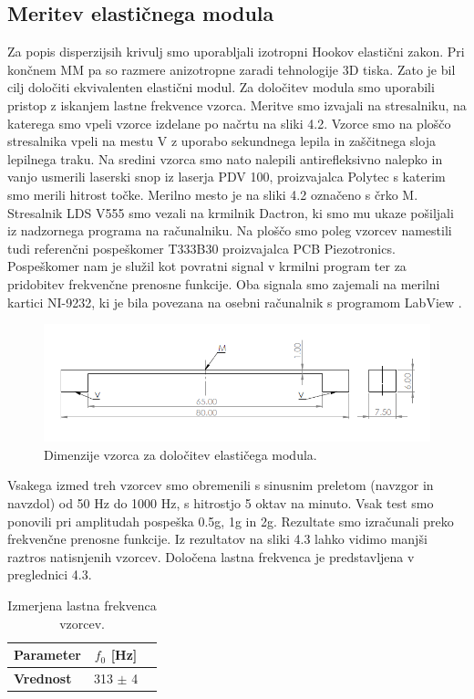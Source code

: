 \documentclass[12pt]{report}
\begin{document}
\subsection{Meritev elastičnega modula}
Za popis disperzijsih krivulj smo uporabljali izotropni Hookov elastični zakon. Pri končnem \ac{MM} pa so razmere anizotropne zaradi tehnologije 3D tiska. Zato je bil cilj določiti ekvivalenten 
elastični modul. Za določitev modula smo uporabili pristop z iskanjem lastne frekvence vzorca. Meritve smo izvajali na stresalniku, na katerega smo vpeli vzorce izdelane po načrtu na sliki 4.2. Vzorce smo na 
ploščo stresalnika vpeli na mestu V z uporabo sekundnega lepila in zaščitnega sloja lepilnega traku. Na sredini vzorca smo nato nalepili antirefleksivno nalepko in vanjo usmerili laserski snop iz laserja PDV 100, proizvajalca
Polytec s katerim smo merili hitrost točke. Merilno mesto je na sliki 4.2 označeno s črko M. Stresalnik LDS V555 smo vezali na krmilnik Dactron, ki smo mu ukaze pošiljali iz nadzornega programa na računalniku. Na ploščo smo poleg vzorcev namestili tudi 
referenčni pospeškomer T333B30 proizvajalca PCB Piezotronics. Pospeškomer nam je služil kot povratni signal v krmilni program ter za pridobitev frekvenčne prenosne funkcije. Oba signala smo zajemali na merilni kartici NI-9232, ki je bila povezana
na osebni računalnik s programom LabView \cite{labview}.
\\
\begin{figure}[H]
  \centering
  \includegraphics[scale=0.9]{Images/tester.png}
  \caption{Dimenzije vzorca za določitev elastičega modula.}
\end{figure}
\noindent Vsakega izmed treh vzorcev smo obremenili s sinusnim preletom (navzgor in navzdol) od 50 Hz do 1000 Hz, s hitrostjo 5 oktav na minuto. Vsak test smo ponovili pri amplitudah pospeška 0.5g, 1g in 2g. Rezultate smo izračunali preko frekvenčne
prenosne funkcije. Iz rezultatov na sliki 4.3 lahko vidimo manjši raztros natisnjenih vzorcev. Določena lastna frekvenca je predstavljena v preglednici 4.3.
\begin{table}[H]
  \caption{Izmerjena lastna frekvenca vzorcev.}
  \centering
  \begin{tabular}{ | l | c | r | }
    \hline
    \textbf{Parameter} & $f_0$ [Hz] \\ \hline
    \textbf{Vrednost} & 313 $\pm$ 4 \\
    \hline  
  \end{tabular}
\end{table}
\end{document}
